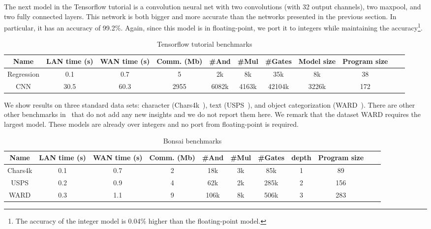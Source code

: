 The next model in the Tensorflow tutorial is a convolution neural net with two convolutions
(with 32 output channels), two maxpool, and two fully connected layers.
This network is both bigger and more accurate than the networks presented in the previous section.
In particular, it has an accuracy of 99.2\%. Again, since this model is in floating-point,
we port it to integers while maintaining the accuracy\footnote{The accuracy of the integer model is 0.04\% higher than the floating-point model.}.


\begin{table*}
\begin{tabular}{c|c|c|c |c|c|c|c|c|c | c}
Name       & LAN time (s) & WAN time (s) & Comm. (Mb)  & \#And & \#Mul & \#Gates & Model size & Program size\\
\hline
Regression &  0.1         & 0.7         & 5            & 2k    & 8k    &  35k    & 8k   & 38\\
\hline
CNN        &  30.5        & 60.3        & 2955         & 6082k & 4163k &  42104k & 3226k& 172\\
\hline
\end{tabular}

 \caption{Tensorflow tutorial benchmarks}
 \label{tab:tf} 
\end{table*}


We show \bonsai results on three standard data sets: character  (Chars4k~\cite{campos}), text (USPS~\cite{hull}), and object categorization (WARD~\cite{yang}). There are other other benchmarks in~\cite{bonsai} that do not add any new insights and we do not report them here. We remark that the dataset WARD requires the largest model. These models are already over integers and no port from floating-point is required.


\begin{table*}
\begin{tabular}{c|c|c|c |c|c|c|c|c|c | c}
Name       & LAN time (s) & WAN time (s) & Comm. (Mb)  & \#And & \#Mul & \#Gates & depth & Program size\\
\hline
Chars4k    &  0.1         & 0.7         & 2            & 18k    & 3k    &  85k     & 1   & 89\\
\hline
USPS       &  0.2         & 0.9         & 4            & 62k    & 2k    &  285k    & 2   & 156\\
\hline
WARD       &  0.3         & 1.1         & 9            & 106k    & 8k    &  506k    & 3   & 283\\
\hline
\end{tabular}

 \caption{Bonsai benchmarks}
 \label{tab:bonsai} 
\end{table*}

